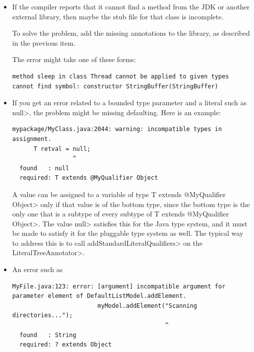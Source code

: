 \begin{itemize}
To solve the problem, add the missing annotations to the library (see
Chapter~\ref{annotating-libraries}).  The
annotations might appear in stub files ( files distributed
with the checker's source code)
or in annotated libraries (which appear
in \url{https://github.com/typetools/}).

\item
If the compiler reports that it cannot find a method from the JDK or
another external library, then maybe the stub file for that class
is incomplete.

To solve the problem, add the missing annotations to the library, as
described in the previous item.

The error might take one of these forms:

\begin{Verbatim}
method sleep in class Thread cannot be applied to given types
cannot find symbol: constructor StringBuffer(StringBuffer)
\end{Verbatim}

\item
If you get an error related to a bounded type parameter and a literal such
as \<null>, the problem might be missing defaulting.  Here is an example:

\begin{Verbatim}
mypackage/MyClass.java:2044: warning: incompatible types in assignment.
      T retval = null;
                 ^
  found   : null
  required: T extends @MyQualifier Object
\end{Verbatim}

\noindent
A value can be assigned to a variable of type \<T extends @MyQualifier
Object> only if that value is of the bottom type, since the bottom type is
the only one that is a subtype of every subtype of \<T extends @MyQualifier
Object>.  The value \<null> satisfies this for the Java type system, and it
must be made to satisfy it for the pluggable type system as well.  The
typical way to address this is to call \<addStandardLiteralQualifiers> on the \<LiteralTreeAnnotator>.

\item
An error such as

\begin{Verbatim}
MyFile.java:123: error: [argument] incompatible argument for parameter element of DefaultListModel.addElement.
                        myModel.addElement("Scanning directories...");
                                           ^
  found   : String
  required: ? extends Object
\end{Verbatim}


\end{itemize}
